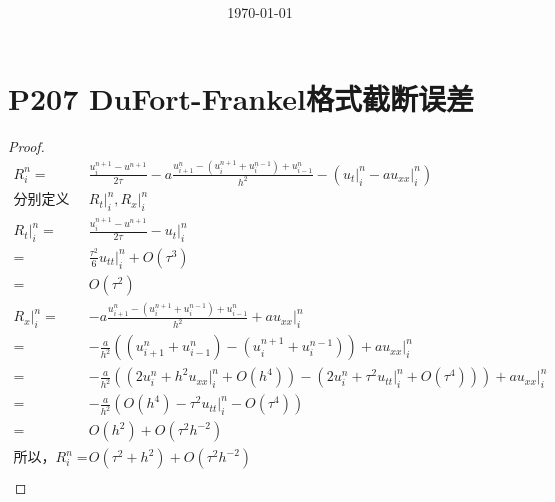 \documentclass{article}%
\title{\heiti \myArticleName \\ [2ex] \begin{large} \myHomeworkNumber \end{large}}
\author{\kaishu \myName \myNumber}
\date{\today}
\begin{document}
\maketitle
\section{P207 DuFort-Frankel格式截断误差}
\begin{proof}
	\begin{align*}
		R^n_i=&\frac{u^{n+1}_i-u^{n+1}}{2\tau}-a\frac{u^{n}_{i+1}-(u^{n+1}_i+u^{n-1}_i)+u^{n}_{i-1}}{h^2}-(u_t \big|^n_i-au_{xx} \big|^n_i) \\
		\text{分别定义}&R_t \big|^n_i,R_x\big|^n_i \\
		R_t \big|^n_i=&\frac{u^{n+1}_i-u^{n+1}}{2\tau}-u_t \big|^n_i \\
		=&\frac{\tau^2}{6}u_{tt}\big|^n_i+O(\tau^3) \\
		=&O(\tau^2) \\
		R_x\big|^n_i=&-a\frac{u^{n}_{i+1}-(u^{n+1}_i+u^{n-1}_i)+u^{n}_{i-1}}{h^2}+au_{xx} \big|^n_i \\
		=&-\frac{a}{h^2}\left ((u^{n}_{i+1}+u^{n}_{i-1})-(u^{n+1}_i+u^{n-1}_i)  \right )+au_{xx} \big|^n_i \\
		=&-\frac{a}{h^2}\left ((2u^{n}_{i}+h^2u_{xx}\big|^n_i+O(h^4))-(2u^{n}_{i}+\tau^2u_{tt}\big|^n_i+O(\tau^4))  \right )+au_{xx} \big|^n_i \\
		=&-\frac{a}{h^2}\left (O(h^4)-\tau^2u_{tt}\big|^n_i-O(\tau^4)  \right ) \\
		=&O(h^2)+O(\tau^2h^{-2}) \\
		\text{所以，}R^n_i=&O(\tau^2+h^2)+O(\tau^2h^{-2}) \\
	\end{align*}
\end{proof}
\end{document}
